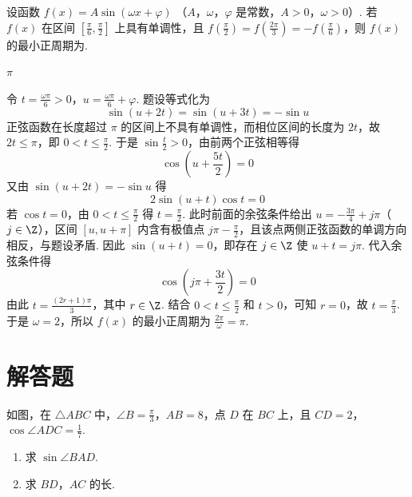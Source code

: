\begin{problem}
设函数 \( f(x) = A \sin (\omega x + \varphi) \) （\(A\)，\(\omega\)，\(\varphi\) 是常数，\( A > 0 \)，\(\omega > 0\)）. 若 \( f(x) \) 在区间 \( \left[\frac{\pi}{6}, \frac{\pi}{2}\right] \) 上具有单调性，且 \( f\left(\frac{\pi}{2}\right) = f\left(\frac{2\pi}{3}\right) = -f\left(\frac{\pi}{6}\right) \)，则 \( f(x) \) 的最小正周期为\fillinblank{}.
\end{problem}

\begin{answer}
\(\pi\)
\end{answer}

\begin{solution}
令 \(t=\frac{\omega\pi}{6}>0\)，\(u=\frac{\omega\pi}{6}+\varphi\). 题设等式化为
\[
\sin(u+2t)=\sin(u+3t)=-\sin u
\]
正弦函数在长度超过 \(\pi\) 的区间上不具有单调性，而相位区间的长度为 \(2t\)，故 \(2t\leqslant\pi\)，即 \(0<t\leqslant\frac{\pi}{2}\). 于是 \(\sin\frac t2>0\)，由前两个正弦相等得
\[
\cos\left(u+\frac{5t}{2}\right)=0
\]
又由 \(\sin(u+2t)=-\sin u\) 得
\[
2\sin(u+t)\cos t=0
\]
若 \(\cos t=0\)，由 \(0<t\leqslant\frac\pi2\) 得 \(t=\frac\pi2\). 此时前面的余弦条件给出 \(u=-\frac{3\pi}{4}+j\pi\)（\(j\in\Z\)），区间 \([u,u+\pi]\) 内含有极值点 \(j\pi-\frac\pi2\)，且该点两侧正弦函数的单调方向相反，与题设矛盾. 因此 \(\sin(u+t)=0\)，即存在 \(j\in\Z\) 使 \(u+t=j\pi\). 代入余弦条件得
\[
\cos\left(j\pi+\frac{3t}{2}\right)=0
\]
由此 \(t=\frac{(2r+1)\pi}{3}\)，其中 \(r\in\Z\).
结合 \(0<t\leqslant\frac\pi2\) 和 \(t>0\)，可知 \(r=0\)，故 \(t=\frac\pi3\). 于是 \(\omega=2\)，所以 \(f(x)\) 的最小正周期为 \(\frac{2\pi}{\omega}=\pi\).
\end{solution}

\section{解答题}

\begin{problem}
如图，在 \(\triangle ABC\) 中，\(\angle B = \frac{\pi}{3}\)，\(AB = 8\)，点 \(D\) 在 \(BC\) 上，且 \(CD = 2\)，\(\cos \angle ADC = \frac{1}{7}\).

\begin{enumerate}
\item 求 \(\sin \angle BAD\).
\item 求 \(BD\)，\(AC\) 的长.
\end{enumerate}

\end{problem}

